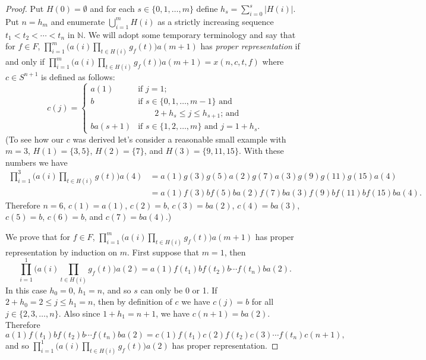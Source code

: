 \documentclass[12pt,showtrims]{memoir}
\theoremstyle{plain}
\theoremstyle{definition}
\newcommand{\bbN}{\mathbb{N}}
\begin{document}
\begin{proof}
  Put $H(0) = \emptyset$ and for each $s \in \{0, 1, \ldots, m\}$ define $h_s = \sum_{i=0}^s |H(i)|$.
  Put $n = h_m$ and enumerate $\bigcup_{i=1}^m H(i)$ as a strictly increasing sequence $t_1 < t_2 < \cdots < t_n$ in $\bbN$. 
  We will adopt some temporary terminology and say that for $f \in F$, $\prod_{i=1}^m \bigl( a(i) \prod_{t \in H(i)} g_f(t) \bigr) a(m+1)$ has \emph{proper representation} if and only if $\prod_{i=1}^m \bigl( a(i) \prod_{t \in H(i)} g_f(t) \bigr) a(m+1) = x(n, c, t, f)$ where $c \in S^{n+1}$ is defined as follows:
  \[
    c(j) = 
    \begin{cases}
      a(1) & \mbox{if $j = 1$;} \\
      b & \mbox{if $s \in \{0, 1, \ldots, m-1\}$ and} \\
      &   \hspace{2em}\mbox{$2+h_s \le j \le h_{s+1}$; and} \\
      ba(s+1) & \mbox{if $s \in \{1, 2, \ldots, m\}$ and $j = 1+h_s$.}
    \end{cases}
  \]
  {
    (To see how our $c$ was derived let's consider a reasonable small example with $m = 3$, $H(1) = \{3, 5\}$, $H(2) = \{7\}$, and $H(3) = \{9, 11, 15\}$.
    With these numbers we have
    \begin{align*}
      \textstyle
      \prod_{i=1}^3 \bigl( a(i) \prod_{t \in H(i)} g(t) \bigr) a(4) &=
      a(1) g(3)g(5) a(2) g(7) a(3) g(9)g(11)g(15) a(4) \\
      &= a(1) f(3)bf(5)b a(2) f(7)b a(3) f(9)bf(11)bf(15)b a(4).
    \end{align*}
    Therefore $n = 6$, $c(1) = a(1)$, $c(2) = b$, $c(3) = ba(2)$, $c(4) = ba(3)$, $c(5) = b$,  $c(6) = b$, and $c(7) = ba(4)$.)
  }

  We prove that for $f \in F$, $\prod_{i=1}^m \bigl( a(i) \prod_{t \in H(i)} g_f(t) \bigr) a(m+1)$ has proper representation by induction on $m$. 
  First suppose that $m = 1$, then 
  \[
    \textstyle
    \prod_{i=1}^1 \bigl( a(i) \prod_{t \in H(i)} g_f(t) \bigr) a(2) = a(1) f(t_1)b  f(t_2)b \cdots f(t_n)b a(2).
  \]
  In this case $h_0 = 0$, $h_1 = n$, and so $s$ can only be 0 or 1.
  If $2+h_0 = 2 \le j \le h_1 = n$, then by definition of $c$ we have $c(j) = b$ for all $j \in \{2, 3, \ldots, n\}$. 
  Also since $1 + h_1 = n+1$, we have $c(n+1) = ba(2)$. 
  Therefore
  \[
    \textstyle
    a(1) f(t_1)b  f(t_2)b \cdots f(t_n)b a(2) = c(1) f(t_1) c(2) f(t_2) c(3) \cdots f(t_n) c(n+1),
  \]
  and so $\prod_{i=1}^1 \bigl( a(i) \prod_{t \in H(i)} g_f(t) \bigr) a(2)$ has proper representation. 


\end{proof}
\end{document}
